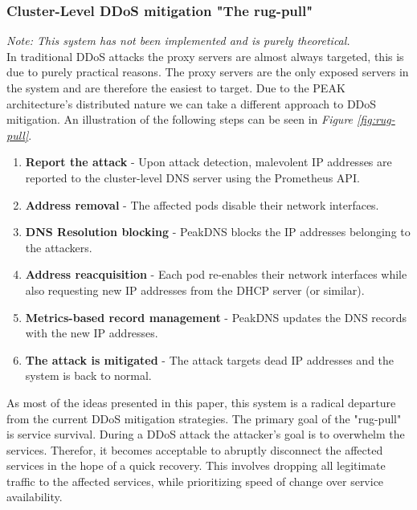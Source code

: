\documentclass[12pt]{article}
\begin{document}
\subsubsection{Cluster-Level DDoS mitigation "The rug-pull"}
\textit{Note: This system has not been implemented and is purely theoretical.} \\
In traditional DDoS attacks the proxy servers are almost always targeted, this is due to purely practical reasons.
The proxy servers are the only exposed servers in the system and are therefore the easiest to target. Due to the 
PEAK architecture's distributed nature we can take a different approach to DDoS mitigation.
An illustration of the following steps can be seen in \textit{Figure \ref{fig:rug-pull}}.
\begin{enumerate}
    \item \textbf{Report the attack} - Upon attack detection, malevolent IP addresses are reported to the cluster-level DNS server using the Prometheus API.
    \item \textbf{Address removal} - The affected pods disable their network interfaces.
    \item \textbf{DNS Resolution blocking} - PeakDNS blocks the IP addresses belonging to the attackers.
    \item \textbf{Address reacquisition} - Each pod re-enables their network interfaces while also requesting new IP addresses from the DHCP server (or similar).
    \item \textbf{Metrics-based record management} - PeakDNS updates the DNS records with the new IP addresses.
    \item \textbf{The attack is mitigated} - The attack targets dead IP addresses and the system is back to normal.
\end{enumerate}
As most of the ideas presented in this paper, this system is a radical departure from the current DDoS mitigation strategies.
The primary goal of the "rug-pull" is service survival. During a DDoS attack the attacker's goal is to overwhelm the services.
Therefor, it becomes acceptable to abruptly disconnect the affected services in the hope of a quick recovery. This involves
dropping all legitimate traffic to the affected services, while prioritizing speed of change over service availability.
\end{document}
